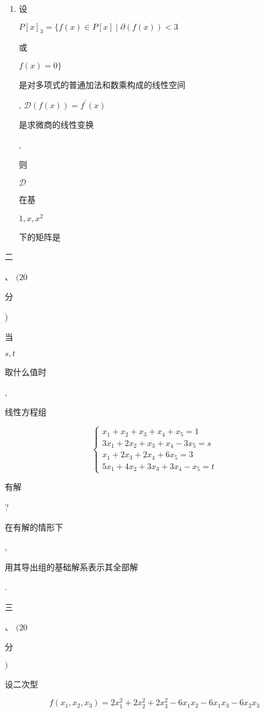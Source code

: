 \documentclass[10pt]{article}
\begin{document}
\begin{enumerate}
  \item \begin{CJK}{UTF8}{mj}设\end{CJK} $P[x]_{3}=\{f(x) \in P[x] \mid \partial(f(x))<3$ \begin{CJK}{UTF8}{mj}或\end{CJK} $f(x)=0\}$ \begin{CJK}{UTF8}{mj}是对多项式的普通加法和数乘构成的线性空间\end{CJK}, $\mathscr{D}(f(x))=f^{\prime}(x)$ \begin{CJK}{UTF8}{mj}是求微商的线性变换\end{CJK}, \begin{CJK}{UTF8}{mj}则\end{CJK} $\mathscr{D}$ \begin{CJK}{UTF8}{mj}在基\end{CJK} $1, x, x^{2}$ \begin{CJK}{UTF8}{mj}下的矩阵是\end{CJK}

\end{enumerate}
\begin{CJK}{UTF8}{mj}二\end{CJK}、 $(20$ \begin{CJK}{UTF8}{mj}分\end{CJK}) \begin{CJK}{UTF8}{mj}当\end{CJK} $s, t$ \begin{CJK}{UTF8}{mj}取什么值时\end{CJK}, \begin{CJK}{UTF8}{mj}线性方程组\end{CJK}
$$
\left\{\begin{array}{l}
x_{1}+x_{2}+x_{3}+x_{4}+x_{5}=1 \\
3 x_{1}+2 x_{2}+x_{3}+x_{4}-3 x_{5}=s \\
x_{1}+2 x_{3}+2 x_{4}+6 x_{5}=3 \\
5 x_{1}+4 x_{2}+3 x_{3}+3 x_{4}-x_{5}=t
\end{array}\right.
$$
\begin{CJK}{UTF8}{mj}有解\end{CJK}? \begin{CJK}{UTF8}{mj}在有解的情形下\end{CJK}, \begin{CJK}{UTF8}{mj}用其导出组的基础解系表示其全部解\end{CJK}.

\begin{CJK}{UTF8}{mj}三\end{CJK}、 $(20$ \begin{CJK}{UTF8}{mj}分\end{CJK} $)$ \begin{CJK}{UTF8}{mj}设二次型\end{CJK}
$$
f\left(x_{1}, x_{2}, x_{3}\right)=2 x_{1}^{2}+2 x_{2}^{2}+2 x_{3}^{2}-6 x_{1} x_{2}-6 x_{1} x_{3}-6 x_{2} x_{3}
$$
\end{document}
